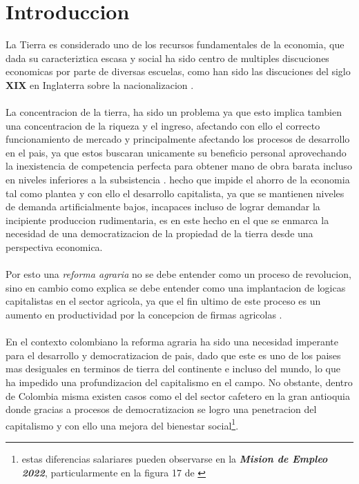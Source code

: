 \documentclass[11pt]{article}
\begin{document}
{\section{Introduccion}
\begin{flushleft}
    La Tierra es considerado uno de los recursos fundamentales de la economia, que dada su caracteriztica escasa 
    y social ha sido centro de multiples discuciones economicas por parte de diversas escuelas,
    como han sido las discuciones del siglo \textbf{XIX} en Inglaterra sobre la nacionalizacion \citep{Ramos2007}.
    \\~\\
    La concentracion de la tierra, ha sido un problema ya que esto implica tambien una concentracion de la riqueza y el ingreso,
    afectando con ello el correcto funcionamiento de mercado y principalmente afectando los procesos de desarrollo en el pais,
    ya que estos buscaran unicamente su beneficio personal aprovechando la inexistencia de competencia perfecta para obtener mano de obra barata incluso en niveles inferiores a la subsistencia \citep{Cardenas1954}.
    hecho que impide el ahorro de la economia tal como plantea \citet{Say} y con ello el desarrollo capitalista, ya que se mantienen niveles de demanda artificialmente bajos,
    incapaces incluso de lograr demandar la incipiente produccion rudimentaria, es en este hecho en el que se enmarca la necesidad de una democratizacion de la propiedad de la tierra desde una perspectiva economica.
    \\~\\
    Por esto una \textit{reforma agraria} no se debe entender como un proceso de revolucion, sino en cambio como explica \citet{lenin_1971}
    se debe entender como una implantacion de logicas capitalistas en el sector agricola, ya que el fin ultimo de este proceso es un aumento 
    en productividad por la concepcion de firmas agricolas \citep{hamuy_1996}.
    \\~\\
    En el contexto colombiano la reforma agraria ha sido una necesidad imperante para el desarrollo y democratizacion de pais,
    dado que este es uno de los paises mas desiguales en terminos de tierra del continente e incluso del mundo,
    lo que ha impedido una profundizacion del capitalismo en el campo. No obstante, 
    dentro de Colombia misma existen casos como el del sector cafetero en la gran antioquia donde gracias a procesos de democratizacion se logro
    una penetracion del capitalismo y con ello una mejora del bienestar social\footnote{estas diferencias salariares pueden observarse en la \textit{\textbf{Mision de Empleo 2022}},
    particularmente en la figura 17 de \citep{AMM2021}}.
    

\end{flushleft}}
\end{document}
